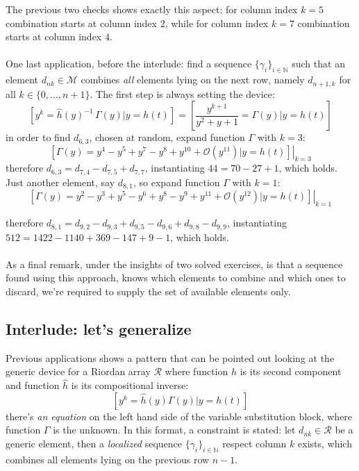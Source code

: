 The previous two checks shows exactly this aspect: for column index $k=5$
combination starts at column index $2$, while for column index $k=7$ combination
starts at column index $4$.
\\\\
One last application, before the interlude: 
find a sequence $\lbrace \gamma_{i} \rbrace_{i\in\mathbb{N}}$ such that 
an element $d_{nk}\in\mathcal{M}$ combines \emph{all} elements lying on 
the next row, namely $d_{n+1,k}$ for all $k\in\lbrace0,\ldots,n+1\rbrace$.
The first step is always setting the device:
\begin{displaymath}
    \left[y^{k} = \hat{h}(y)^{-1}\,\Gamma(y) \big| y = h(t) \right]=
        \left[ \frac{y^{k + 1}}{y^2 + y + 1} = \Gamma(y) \big| y = h(t) \right]
\end{displaymath}
in order to find $d_{6,3}$, chosen at random, expand function $\Gamma$ with $k=3$:
\begin{displaymath}
    \left.\left[\Gamma(y)=y^4 -y^5 + y^7 -y^8 +y^{10} + \mathcal{O}(y^{11}) 
        \big| y = h(t) \right]\right|_{k=3}
\end{displaymath}
therefore $d_{6,3}=d_{7,4} - d_{7,5} + d_{7,7}$, instantiating $44 = 70 -27 +1$, 
which holds. Just another element, say $d_{8,1}$, so expand function 
$\Gamma$ with $k=1$:
\begin{displaymath}
    \left.\left[\Gamma(y)=y^2 -y^3 + y^5 -y^6 + y^8 -y^9 + y^{11} + 
        \mathcal{O}(y^{12}) \big| y = h(t) \right]\right|_{k=1}
\end{displaymath}

therefore $d_{8,1}=d_{9,2} - d_{9,3} + d_{9,5}- d_{9,6}+ d_{9,8}- d_{9,9}$, 
instantiating $512 = 1422 -1140 +369 -147 +9 -1$, which holds.
\\\\
As a final remark, under the insights of two solved exercises, is that a
sequence found using this approach, knows which elements to combine and which
ones to discard, we're required to supply the set of available elements only.


\subsection{Interlude: let's generalize}

Previous applications shows a pattern that can be pointed out looking at 
the generic device for a Riordan array $\mathcal{R}$ where 
function $h$ is its second component and function $\hat{h}$ 
is its compositional inverse:
\begin{displaymath}
    \left[y^{k} = \hat{h}(y) \Gamma(y) \big| y = h(t) \right]
\end{displaymath}
there's \emph{an equation} on the left hand side of the variable substitution block, 
where function $\Gamma$ is the unknown. In this format, 
a constraint is stated: let $d_{nk}\in\mathcal{R}$ be a generic element, 
then a \emph{localized} sequence 
$\lbrace \gamma_{i} \rbrace_{i\in\mathbb{N}}$ respect column $k$ exists, which
combines all elements lying on the previous row $n-1$.

